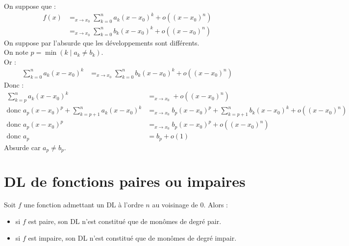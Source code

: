 \documentclass[../main.tex]{subfiles}
\begin{document}
\noindent On suppose que : 
\begin{align*}
    f(x) &=_{x\to x_0} \sum_{k=0}^{n} a_k (x - x_0)^k + o((x - x_0)^n) \\
    &=_{x\to x_0} \sum_{k=0}^{n} b_k (x - x_0)^k + o((x - x_0)^n) 
\end{align*}
On suppose par l'absurde que les développements sont différents. \\
On note $p = \min (k \mid a_k \neq b_k)$. \\
Or : 
\begin{align*}
    \sum_{k=0}^{n} a_k (x - x_0)^k &=_{x\to x_0} \sum_{k=0}^{n} b_k (x - x_0)^k + o((x - x_0)^n)
\end{align*}
Donc : 
\begin{align*}
    \sum_{k=p}^{n} a_k(x - x_0)^k &=_{x\to x_0} + o((x - x_0)^n) \\
    \text{donc } a_p (x - x_0)^p + \sum_{k=p+1}^{n} a_k(x - x_0)^k &=_{x\to x_0} b_p(x - x_0)^p + \sum_{k=p+1}^{n} b_k(x - x_0)^k + o((x - x_0)^n) \\
    \text{donc } a_p (x - x_0)^p &=_{x\to x_0} b_p(x - x_0)^p + o((x - x_0)^n) \\
    \text{donc } a_p &= b_p + o(1)
\end{align*}
Absurde car $a_p \neq b_p$.

\section{DL de fonctions paires ou impaires}
\begin{tcolorbox}[title=Propostion 25.41, title filled=false, colframe=lightblue, colback=lightblue!10!white]
    Soit $f$ une fonction admettant un DL à l'ordre $n$ au voisinage de $0$. Alors : 
    \begin{itemize}
        \item si $f$ est paire, son DL n'est constitué que de monômes de degré pair. 
        \item si $f$ est impaire, son DL n'est constitué que de monômes de degré impair. 
    \end{itemize}
\end{tcolorbox}
\end{document}
